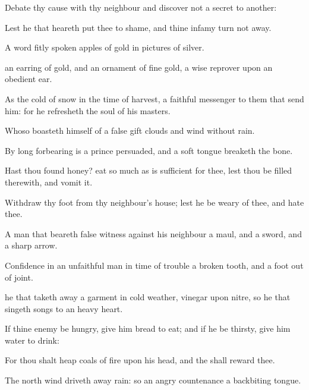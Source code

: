 {Debate thy
cause with thy
neighbour
{} and
discover not a
secret to
another:

Lest he that
heareth
{} put thee to
shame, and thine
infamy turn not
away.


\par }{\PP {}A
word
fitly
spoken
{}
apples of
gold in
pictures of
silver.

 an
earring of
gold, and an
ornament of fine
gold,
{} a
wise
reprover upon an
obedient
ear.

As the
cold of
snow in the
time of
harvest,
{} a
faithful
messenger to them that
send him: for he
refresheth the
soul of his
masters.

Whoso
boasteth himself of a
false
gift
{}
clouds and
wind without
rain.

By
long
forbearing is a
prince
persuaded, and a
soft
tongue
breaketh the
bone.

Hast thou
found
honey?
eat so much as is
sufficient for thee, lest thou be
filled therewith, and
vomit it.

Withdraw thy
foot from thy
neighbour’s
house; lest he be
weary of thee, and
{}
hate thee.

A
man that
beareth
false
witness against his
neighbour
{} a
maul, and a
sword, and a
sharp
arrow.

Confidence in an unfaithful
man in
time of
trouble
{} a
broken
tooth, and a
foot out of
joint.

 he that taketh
away a
garment in
cold
weather,
{}
vinegar upon
nitre, so
{} he that
singeth
songs to an
heavy
heart.


\par }{\PP {}If thine
enemy be
hungry, give him
bread to
eat; and if he be
thirsty, give him
water to
drink:

For thou shalt
heap coals of
fire upon his
head, and the
{} shall
reward thee.

The
north
wind driveth
away
rain: so
{} an
angry
countenance a
backbiting
tongue.

}
